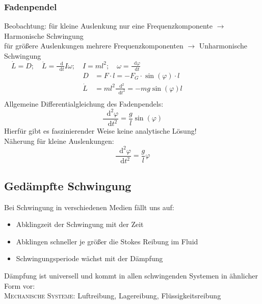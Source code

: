 \documentclass[a4paper,12pt]{report}
\newcommand*\diff{\mathop{}\!\mathrm{d}}
\begin{document}
\subsubsection{Fadenpendel}
Beobachtung: für kleine Auslenkung nur eine Frequenzkomponente $\rightarrow $ Harmonische Schwingung \\
für größere Auslenkungen mehrere Frequenzkomponenten $\rightarrow $  Unharmonische Schwingung \\

$ \quad \dot{L} = D; \quad \ddot{L} = \frac{\diff}{\diff t} I \omega; \quad I = m l^2; \quad  \omega = \frac{\diff \varphi}{\diff t} $ \\

\begin{align*}
D &= F\cdot l = - F_G \cdot \sin(\varphi) \cdot l \\
\dot{L} &= m l^2 \frac{\diff^2}{\diff t^2} = - m g \sin(\varphi) l \\
\end{align*}
Allgemeine Differentialgleichung des Fadenpendels:
 \begin{equation}
 \frac{\diff^2 \varphi}{\diff t^2} = \frac{g}{l} \sin(\varphi)
\end{equation}
Hierfür gibt es faszinierender Weise keine analytische Lösung! \\
Näherung für kleine Auslenkungen:
\begin{equation}
 \frac{\diff^2 \varphi}{\diff t^2} = \frac{g}{l}  \varphi
\end{equation}
\subsection{Gedämpfte Schwingung}

Bei Schwingung in verschiedenen Medien fällt uns auf: \\
\begin{itemize}
\item Abklingzeit der Schwingung mit der Zeit
\item Abklingen schneller je größer die Stokes Reibung im Fluid
\item Schwingungsperiode wächst mit der Dämpfung
\end{itemize}
Dämpfung ist universell und kommt in allen schwingenden Systemen in ähnlicher Form vor: \\


\textsc{Mechanische Systeme:} Luftreibung, Lagereibung, Flüssigkeitsreibung \\
\end{document}
